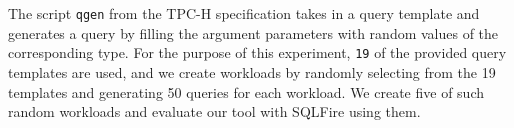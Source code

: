 \begin{table}
\centering
{%
{}
}
\caption{\footnotesize{Row distribution for a dataset of size 1 GB.}}
\label{tab:dataset1gb}
\end{table}

The script \texttt{qgen} from the TPC-H specification takes in a query template and generates a query by filling the argument parameters with random values of the corresponding type. For the purpose of this experiment, \texttt{19} of the provided query templates are used, and we create workloads by randomly selecting from the 19 templates and generating 50 queries for each workload.  We create five of such random workloads and evaluate our tool with SQLFire using them.

